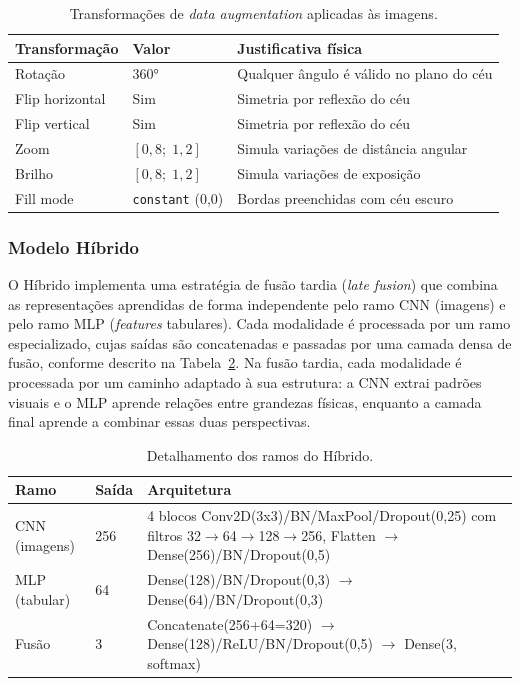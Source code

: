 \documentclass[12pt, a4paper]{article}
\begin{document}
\begin{table}[H]
  \centering
  \caption{Transformações de \textit{data augmentation} aplicadas às imagens.}
  \label{tab:augmentation}
  \begin{tabular}{llp{7cm}}
    \toprule
    \textbf{Transformação} & \textbf{Valor} & \textbf{Justificativa física} \\
    \midrule
    Rotação          & $360°$       & Qualquer ângulo é válido no plano do céu \\
    Flip horizontal  & Sim          & Simetria por reflexão do céu \\
    Flip vertical    & Sim          & Simetria por reflexão do céu \\
    Zoom             & $[0{,}8;\; 1{,}2]$ & Simula variações de distância angular \\
    Brilho           & $[0{,}8;\; 1{,}2]$ & Simula variações de exposição \\
    Fill mode        & \texttt{constant} (0,0) & Bordas preenchidas com céu escuro \\
    \bottomrule
  \end{tabular}
\end{table}

\subsubsection{Modelo Híbrido}

O Híbrido implementa uma estratégia de fusão tardia (\textit{late
fusion}) que combina as representações aprendidas de forma independente
pelo ramo CNN (imagens) e pelo ramo MLP (\textit{features} tabulares).
Cada modalidade é processada por um ramo especializado, cujas saídas são
concatenadas e passadas por uma camada densa de fusão, conforme descrito
na Tabela~\ref{tab:hybrid_arch}. Na fusão tardia, cada modalidade é
processada por um caminho adaptado à sua estrutura: a CNN extrai padrões
visuais e o MLP aprende relações entre grandezas físicas, enquanto a
camada final aprende a combinar essas duas perspectivas.

\begin{table}[H]
  \centering
  \caption{Detalhamento dos ramos do Híbrido.}
  \label{tab:hybrid_arch}
  \begin{tabular}{llp{8.5cm}}
    \toprule
    \textbf{Ramo} & \textbf{Saída} & \textbf{Arquitetura} \\
    \midrule
    CNN (imagens) & 256 & 4 blocos Conv2D(3x3)/BN/MaxPool/Dropout(0,25)
                         com filtros 32$\to$64$\to$128$\to$256,
                         Flatten $\to$ Dense(256)/BN/Dropout(0,5) \\
    MLP (tabular) & 64  & Dense(128)/BN/Dropout(0,3) $\to$
                         Dense(64)/BN/Dropout(0,3) \\
    Fusão & 3 & Concatenate(256+64=320) $\to$ Dense(128)/ReLU/BN/Dropout(0,5)
                $\to$ Dense(3, softmax) \\
    \bottomrule
  \end{tabular}
\end{table}
\end{document}
